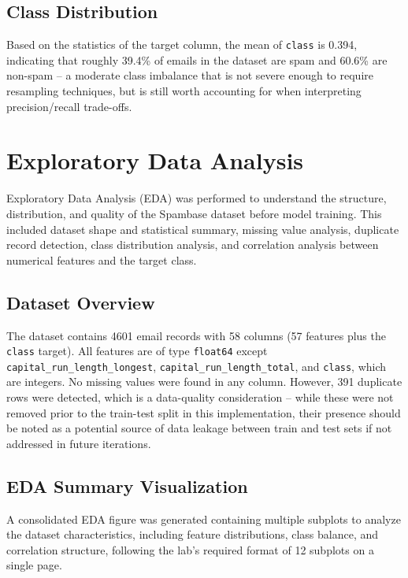 \documentclass[12pt,a4paper]{article}
\begin{document}
\subsection*{Class Distribution}

Based on the statistics of the target column, the mean of \texttt{class} is 0.394, indicating that roughly 39.4\% of emails in the dataset are spam and 60.6\% are non-spam -- a moderate class imbalance that is not severe enough to require resampling techniques, but is still worth accounting for when interpreting precision/recall trade-offs.

\section{Exploratory Data Analysis}

Exploratory Data Analysis (EDA) was performed to understand the structure, distribution, and quality of the Spambase dataset before model training. This included dataset shape and statistical summary, missing value analysis, duplicate record detection, class distribution analysis, and correlation analysis between numerical features and the target class.

\subsection{Dataset Overview}

The dataset contains 4601 email records with 58 columns (57 features plus the \texttt{class} target). All features are of type \texttt{float64} except \texttt{capital\_run\_length\_longest}, \texttt{capital\_run\_length\_total}, and \texttt{class}, which are integers. No missing values were found in any column. However, 391 duplicate rows were detected, which is a data-quality consideration -- while these were not removed prior to the train-test split in this implementation, their presence should be noted as a potential source of data leakage between train and test sets if not addressed in future iterations.

\subsection{EDA Summary Visualization}

A consolidated EDA figure was generated containing multiple subplots to analyze the dataset characteristics, including feature distributions, class balance, and correlation structure, following the lab's required format of 12 subplots on a single page.
\end{document}
